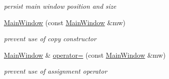 \begin{CompactItemize}
\begin{CompactList}\small\item\em persist main window position and size \item\end{CompactList}\item 
\hypertarget{classMainWindow_67fa2c7eca83bb0cfe6973694b677a43}{
\hyperlink{classMainWindow_67fa2c7eca83bb0cfe6973694b677a43}{MainWindow} (const \hyperlink{classMainWindow}{MainWindow} \&mw)}
\label{classMainWindow_67fa2c7eca83bb0cfe6973694b677a43}

\begin{CompactList}\small\item\em prevent use of copy constructor \item\end{CompactList}\item 
\hypertarget{classMainWindow_a47888dc04bf0b8fe9287ecc2b01d0fe}{
\hyperlink{classMainWindow}{MainWindow} \& \hyperlink{classMainWindow_a47888dc04bf0b8fe9287ecc2b01d0fe}{operator=} (const \hyperlink{classMainWindow}{MainWindow} \&mw)}
\label{classMainWindow_a47888dc04bf0b8fe9287ecc2b01d0fe}

\begin{CompactList}\small\item\em prevent use of assignment operator \item\end{CompactList}\end{CompactItemize}

